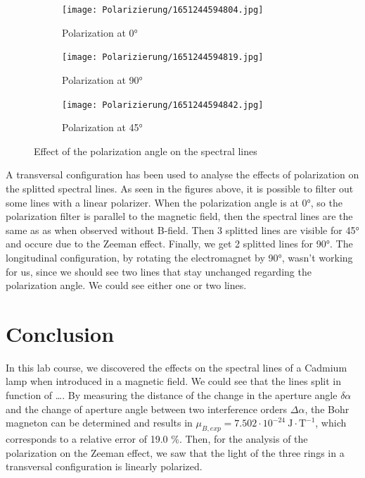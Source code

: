 \documentclass{scrartcl}
\begin{document}
\begin{figure}[h]
     \centering
     \begin{subfigure}[b]{0.3\textwidth}
         \centering
         \texttt{[image: Polarizierung/1651244594804.jpg]}
         \caption{Polarization at 0°} 
         \label{fig:pol0}
     \end{subfigure}
     \hfill
     \begin{subfigure}[b]{0.3\textwidth}
         \centering
         \texttt{[image: Polarizierung/1651244594819.jpg]}
         \caption{Polarization at 90°}
         \label{fig:pol90}
     \end{subfigure}
     \hfill
     \begin{subfigure}[b]{0.3\textwidth}
         \centering
         \texttt{[image: Polarizierung/1651244594842.jpg]}
         \caption{Polarization at 45°}
         \label{fig:pol45}
     \end{subfigure}
     \caption{Effect of the polarization angle on the spectral lines}
     \label{fig:polEffect}
\end{figure}
\FloatBarrier

A transversal configuration has been used to analyse the effects of polarization on the splitted spectral lines. As seen in the figures above, it is possible to filter out some lines with a linear polarizer.
When the polarization angle is at 0°, so the polarization filter is parallel to the magnetic field, then the spectral lines are the same as as when observed without B-field. Then 3 splitted lines are visible for 45° and occure due to the Zeeman effect. Finally, we get 2 splitted lines for 90°.
The longitudinal configuration, by rotating the electromagnet by 90°, wasn't working for us, since we should see two lines that stay unchanged regarding the polarization angle. We could see either one or two lines.

\section{Conclusion}
In this lab course, we discovered the effects on the spectral lines of a Cadmium lamp when introduced in a magnetic field. We could see that the lines split in function of \dots. By measuring the distance of the change in the aperture angle $\delta \alpha$ and the change of aperture angle between two interference orders $\Delta \alpha$, the Bohr magneton can be determined and results in $\mu_{B,exp} = 7.502 \cdot 10^{-24} \ \text{J} \cdot \text{T}^{-1}$, which corresponds to a relative error of 19.0 \%. Then, for the analysis of the polarization on the Zeeman effect, we saw that the light of the three rings in a transversal configuration is linearly polarized.
\end{document}
